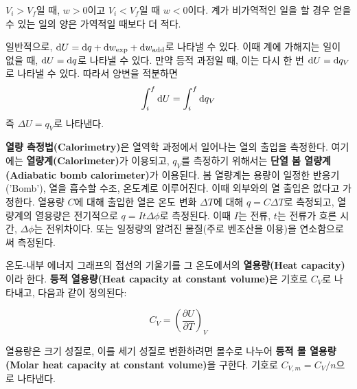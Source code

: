             $V_i > V_f$일 때, $w > 0$이고 $V_i < V_f$일 때 $w < 0$이다. 계가 비가역적인 일을 할 경우 얻을 수 있는 일의 양은 가역적일 때보다 더 적다.
            \par 일반적으로, $\operatorname{d\!} U = \operatorname{d\!} q + \operatorname{d\!} w_{\mathrm{exp}} + \operatorname{d\!} w_{\mathrm{add}}$로 나타낼 수 있다. 이때 
            계에 가해지는 일이 없을 때, $\operatorname{d\!} U = \operatorname{d\!} q$로 나타낼 수 있다. 만약 등적 과정일 때, 이는 다시 한 번 
            $\operatorname{d\!} U=\operatorname{d\!} q_V$로 나타낼 수 있다. 따라서 양변을 적분하면
                \begin{equation*}
                    \int_{i}^{f}\operatorname{d\!} U = \int_{i}^{f}\operatorname{d\!} q_V
                \end{equation*}
            즉 $\Delta U = q_V$로 나타낸다.
            \par \textbf{열량 측정법(Calorimetry)}은 열역학 과정에서 일어나는 열의 출입을 측정한다. 여기에는 \textbf{열량계(Calorimeter)}가 이용되고, 
            $q_V$를 측정하기 위해서는 \textbf{단열 봄 열량계(Adiabatic bomb calorimeter)}가 이용된다. 봄 열량계는 용량이 일정한 반응기('Bomb'), 열을 흡수할 수조, 
            온도계로 이루어진다. 이때 외부와의 열 출입은 없다고 가정한다. 열용량 $C$에 대해 출입한 열은 온도 변화 $\Delta T$에 대해 $q = C\Delta T$로 측정되고, 
            열량계의 열용량은 전기적으로 $q = It\Delta \phi$로 측정된다. 이때 $I$는 전류, $t$는 전류가 흐른 시간, $\Delta \phi$는 전위차이다. 또는 일정량의 알려진 
            물질(주로 벤조산을 이용)을 연소함으로써 측정된다.
            \par 온도-내부 에너지 그래프의 접선의 기울기를 그 온도에서의 \textbf{열용량(Heat capacity)}이라 한다. \textbf{등적 열용량(Heat capacity at constant volume)}은 
            기호로 $C_V$로 나타내고, 다음과 같이 정의된다:
            \begin{defn}[등적 열용량]
                \begin{equation*}
                    C_V = \left( \frac{\partial U}{\partial T}\right)_V
                \end{equation*}
            \end{defn}
            열용량은 크기 성질로, 이를 세기 성질로 변환하려면 몰수로 나누어 \textbf{등적 몰 열용량(Molar heat capacity at constant volume)}을 구한다. 
            기호로 $C_{V,m} = C_V / n$으로 나타낸다.
